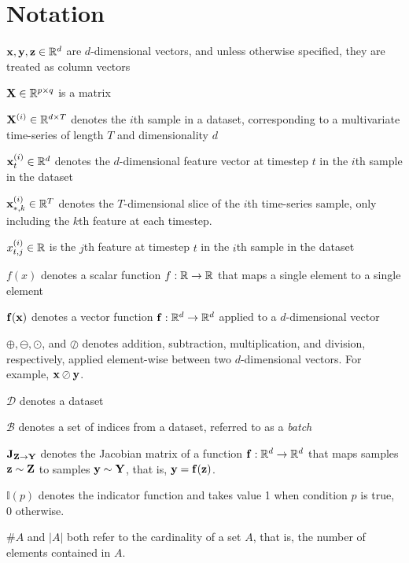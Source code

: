 \documentclass{statsmsc}
\begin{document}
{\chapter*{Notation}\thispagestyle{plain}
    $\mathbf{x}, \mathbf{y}, \mathbf{z}\in\mathbb{R}^d$ are $d$-dimensional vectors, and unless otherwise specified, they are
    treated as column vectors

    $\mathbf{X} \in \mathbb{R}^{p \times q}$ is a matrix

    $\mathbf{X}^{(i)} \in \mathbb{R}^{d \times T}$ denotes the $i$th sample in a dataset, corresponding to a multivariate time-series of length $T$ and dimensionality $d$

    $\mathbf{x}^{(i)}_t \in \mathbb{R}^d$ denotes the $d$-dimensional feature vector at timestep $t$ in the $i$th sample in the dataset

    $\mathbf{x}^{(i)}_{*,k} \in \mathbb{R}^T$ denotes the $T$-dimensional slice of the $i$th time-series sample, only including the $k$th feature at each timestep.

    $x^{(i)}_{t,j}\in\mathbb{R}$ is the $j$th feature at timestep $t$ in the $i$th sample in the dataset

    $f(x)$ denotes a scalar function $f: \mathbb{R} \rightarrow {\mathbb{R}}$ that maps a single element to a single element

    $\mathbf{f}(\mathbf{x})$ denotes a vector function $\mathbf{f}:\mathbb{R}^d \rightarrow {\mathbb{R}^d}$ applied to a $d$-dimensional vector

    $\oplus, \ominus, \odot$, and $\oslash$ denotes addition, subtraction, multiplication, and division, respectively, applied element-wise between two $d$-dimensional vectors. For example, $\mathbf{x} \oslash \mathbf{y}$.

    $\mathcal{D}$ denotes a dataset

    $\mathcal{B}$ denotes a set of indices from a dataset, referred to as a \textit{batch}

    $\mathbf{J}_{\mathbf{Z} \rightarrow {\mathbf{Y}}}$ denotes the Jacobian matrix of a function $\mathbf{f} : \mathbb{R}^d \rightarrow {\mathbb{R}^d}$ that maps samples $\mathbf{z} \sim \mathbf{Z}$ to samples $\mathbf{y} \sim \mathbf{Y}$, that is,
    $\mathbf{y}=\mathbf{f}(\mathbf{z})$.

    $\mathbb{I}(p)$ denotes the indicator function and takes value 1 when condition $p$ is true,
    0 otherwise.

    $\#A$ and $|A|$ both refer to the cardinality of a set $A$, that is, the number of elements contained in $A$.


}
\end{document}
